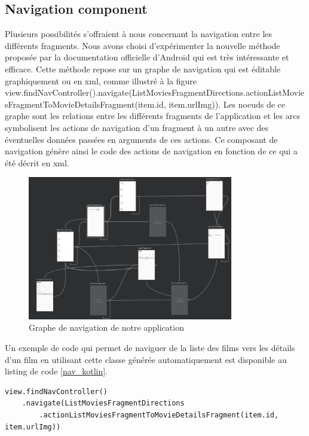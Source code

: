 \subsection{Navigation component}
Plusieurs possibilités s'offraient à nous concernant la navigation entre les différents fragments. Nous avons choisi d'expérimenter la nouvelle méthode proposée par la documentation officielle d'Android qui est très intéressante et efficace.
Cette méthode repose sur un graphe de navigation qui est éditable graphiquement ou en \acrshort{xml}, comme illustré à la figure view.findNavController().navigate(ListMoviesFragmentDirections.actionListMoviesFragmentToMovieDetailsFragment(item.id, item.urlImg)). Les noeuds de ce graphe sont les relations entre les différents fragments de l'application et les arcs symbolisent les actions de navigation d'un fragment à un autre avec des éventuelles données passées en arguments de ces actions. Ce composant de navigation génère ainsi le code des actions de navigation en fonction de ce qui a été décrit en \acrshort{xml}.
\begin{figure}
    \begin{center}
        \includegraphics[width=0.8\textwidth]{img/screenshots/nav_graph.png}
    \end{center}
    \caption{Graphe de navigation de notre application}
    \label{nav_graph}
\end{figure}

Un exemple de code qui permet de naviguer de la liste des films vers les détails d'un film en utilisant cette classe générée automatiquement est disponible au listing de code \ref{nav_kotlin}.
\bigbreak
\begin{code}
    \begin{verbatim}
view.findNavController()
    .navigate(ListMoviesFragmentDirections
        .actionListMoviesFragmentToMovieDetailsFragment(item.id, item.urlImg))
    \end{verbatim}
    \caption{Exemple de navigation}
    \label{nav_kotlin}
\end{code}
\bigbreak


